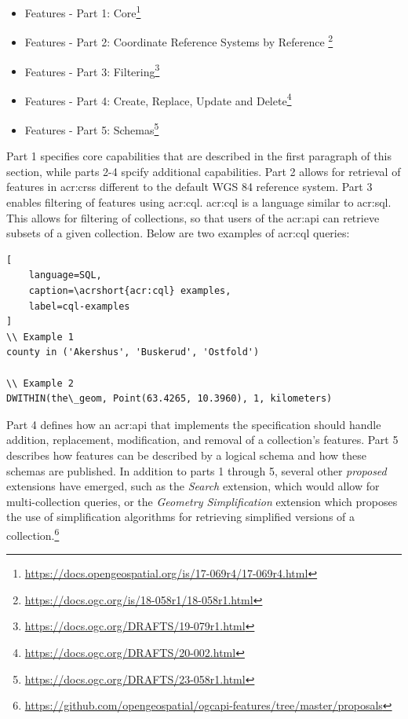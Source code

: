 \begin{itemize}
    \item Features - Part 1: Core\footnote{\url{https://docs.opengeospatial.org/is/17-069r4/17-069r4.html}}
    \item Features - Part 2: Coordinate Reference Systems by Reference \footnote{\url{https://docs.ogc.org/is/18-058r1/18-058r1.html}}
    \item Features - Part 3: Filtering\footnote{\url{https://docs.ogc.org/DRAFTS/19-079r1.html}}
    \item Features - Part 4: Create, Replace, Update and Delete\footnote{\url{https://docs.ogc.org/DRAFTS/20-002.html}}
    \item Features - Part 5: Schemas\footnote{\url{https://docs.ogc.org/DRAFTS/23-058r1.html}}
\end{itemize}

Part 1 specifies core capabilities that are described in the first paragraph of this section, while parts 2-4 spcify additional capabilities. Part 2 allows for retrieval of features in \glspl{acr:crs} different to the default WGS 84 reference system. Part 3 enables filtering of features using \gls{acr:cql}. \gls{acr:cql} is a language similar to \acrshort{acr:sql}. This allows for filtering of collections, so that users of the \acrshort{acr:api} can retrieve subsets of a given collection. Below are two examples of \gls{acr:cql} queries:

\begin{lstlisting}[
    language=SQL,
    caption=\acrshort{acr:cql} examples,
    label=cql-examples
]
\\ Example 1
county in ('Akershus', 'Buskerud', 'Ostfold')

\\ Example 2
DWITHIN(the\_geom, Point(63.4265, 10.3960), 1, kilometers)
\end{lstlisting}

Part 4 defines how an \acrshort{acr:api} that implements the specification should handle addition, replacement, modification, and removal of a collection's features. Part 5 describes how features can be described by a logical schema and how these schemas are published. In addition to parts 1 through 5, several other \textit{proposed} extensions have emerged, such as the \textit{Search} extension, which would allow for multi-collection queries, or the \textit{Geometry Simplification} extension which proposes the use of simplification algorithms for retrieving simplified versions of a collection.\footnote{\url{https://github.com/opengeospatial/ogcapi-features/tree/master/proposals}}


